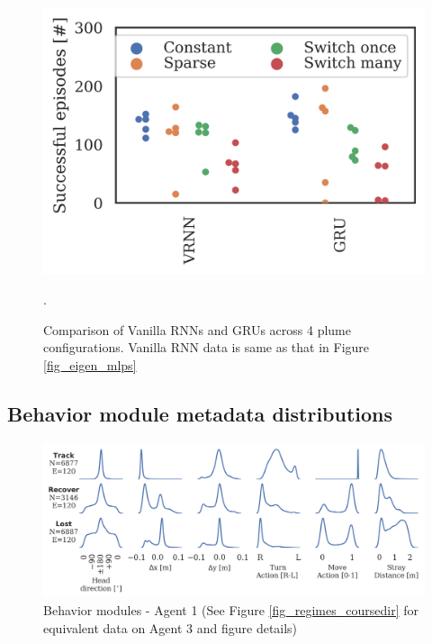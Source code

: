 \documentclass[5p,twocolumn,authoryear]{elsarticle}
\begin{document}
\begin{figure}[h!]
\centering
\includegraphics[width=0.45\linewidth]{home_by_arch_VRNN_GRU.png}
\caption{Comparison of Vanilla RNNs and GRUs across 4 plume configurations. Vanilla RNN data is same as that in Figure \ref{fig_eigen_mlps}}.
\label{fig_supp_gru}
\end{figure}





\clearpage
\subsection{Behavior module metadata distributions}
\label{sec_supp_module}


\begin{figure}[h!]
\centering
\includegraphics[width=0.85\linewidth]{regime_histos_2760377.png}
\caption[Behavior modules - Agent 1]{Behavior modules - Agent 1 (See Figure \ref{fig_regimes_coursedir} for equivalent data on Agent 3 and figure details)}
\end{figure}
\end{document}

